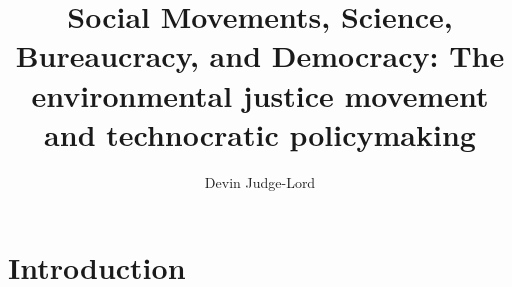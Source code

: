 \documentclass{article}
\title{Social Movements, Science, Bureaucracy, and Democracy: The environmental justice movement and technocratic policymaking}
\author{Devin Judge-Lord} %
\begin{document}
\maketitle
\abstract{}


\newpage
\tableofcontents

\section{Introduction} \label{intro}


\singlespace
\small
 

\end{document}
